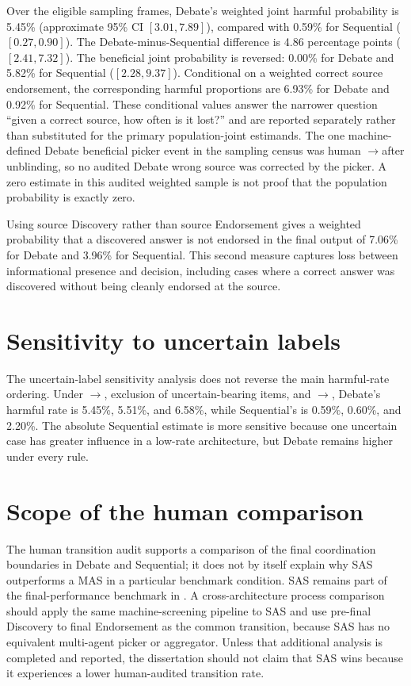 Over the eligible sampling frames, Debate's weighted joint harmful \ctow{} probability is 5.45\% (approximate 95\% CI $[3.01,7.89]$), compared with 0.59\% for Sequential ($[0.27,0.90]$). The Debate-minus-Sequential difference is 4.86 percentage points ($[2.41,7.32]$). The beneficial \wtoc{} joint probability is reversed: 0.00\% for Debate and 5.82\% for Sequential ($[2.28,9.37]$). Conditional on a weighted correct source endorsement, the corresponding harmful proportions are 6.93\% for Debate and 0.92\% for Sequential. These conditional values answer the narrower question ``given a correct source, how often is it lost?'' and are reported separately rather than substituted for the primary population-joint estimands. The one machine-defined Debate beneficial picker event in the sampling census was human \correct$\rightarrow$\correct after unblinding, so no audited Debate wrong source was corrected by the picker. A zero estimate in this audited weighted sample is not proof that the population probability is exactly zero.

Using source Discovery rather than source Endorsement gives a weighted probability that a discovered answer is not endorsed in the final output of 7.06\% for Debate and 3.96\% for Sequential. This second measure captures loss between informational presence and decision, including cases where a correct answer was discovered without being cleanly endorsed at the source.

\section{Sensitivity to uncertain labels}

The uncertain-label sensitivity analysis does not reverse the main harmful-rate ordering. Under \uncertain$\rightarrow$\wrong, exclusion of uncertain-bearing items, and \uncertain$\rightarrow$\correct, Debate's harmful rate is 5.45\%, 5.51\%, and 6.58\%, while Sequential's is 0.59\%, 0.60\%, and 2.20\%. The absolute Sequential estimate is more sensitive because one uncertain case has greater influence in a low-rate architecture, but Debate remains higher under every rule.

\section{Scope of the human comparison}
\label{sec:scope-human}

The human transition audit supports a comparison of the final coordination boundaries in Debate and Sequential; it does not by itself explain why SAS outperforms a MAS in a particular benchmark condition. SAS remains part of the final-performance benchmark in . A cross-architecture process comparison should apply the same machine-screening pipeline to SAS and use pre-final Discovery to final Endorsement as the common transition, because SAS has no equivalent multi-agent picker or aggregator. Unless that additional analysis is completed and reported, the dissertation should not claim that SAS wins because it experiences a lower human-audited transition rate.


